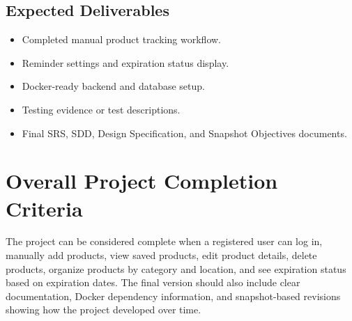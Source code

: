 \documentclass[12pt]{article}
\begin{document}
\subsection{Expected Deliverables}
\begin{itemize}[leftmargin=*]
    \item Completed manual product tracking workflow.
    \item Reminder settings and expiration status display.
    \item Docker-ready backend and database setup.
    \item Testing evidence or test descriptions.
    \item Final SRS, SDD, Design Specification, and Snapshot Objectives documents.
\end{itemize}

\section{Overall Project Completion Criteria}

The project can be considered complete when a registered user can log in, manually add products, view saved products, edit product details, delete products, organize products by category and location, and see expiration status based on expiration dates. The final version should also include clear documentation, Docker dependency information, and snapshot-based revisions showing how the project developed over time.
\end{document}
